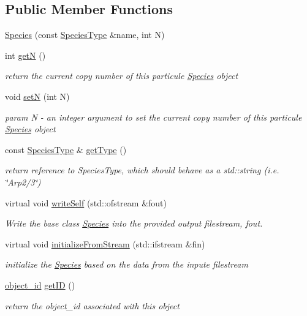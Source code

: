 \subsection*{Public Member Functions}
\begin{DoxyCompactItemize}
\item 
\hyperlink{classSpecies_ac50a5bb29d417423ea43b6698e357436}{Species} (const \hyperlink{Species_8h_af8f3afcc030f67a124aa4a6b5badf495}{Species\-Type} \&name, int N)
\item 
int \hyperlink{classSpecies_a166f138f95713c4fd02dfb47a81b515b}{get\-N} ()
\begin{DoxyCompactList}\small\item\em return the current copy number of this particule \hyperlink{classSpecies}{Species} object \end{DoxyCompactList}\item 
void \hyperlink{classSpecies_af40a72d3e3f8d3cc7bf1dfe209bed39b}{set\-N} (int N)
\begin{DoxyCompactList}\small\item\em param N -\/ an integer argument to set the current copy number of this particule \hyperlink{classSpecies}{Species} object \end{DoxyCompactList}\item 
const \hyperlink{Species_8h_af8f3afcc030f67a124aa4a6b5badf495}{Species\-Type} \& \hyperlink{classSpecies_a7b99d16574deaba7a1f4b60d93f33304}{get\-Type} ()
\begin{DoxyCompactList}\small\item\em return reference to Species\-Type, which should behave as a std\-::string (i.\-e. \char`\"{}\-Arp2/3\char`\"{}) \end{DoxyCompactList}\item 
virtual void \hyperlink{classSpecies_a8a2ec8930dd89c427245f0013aea9c69}{write\-Self} (std\-::ofstream \&fout)
\begin{DoxyCompactList}\small\item\em Write the base class \hyperlink{classSpecies}{Species} into the provided output filestream, fout. \end{DoxyCompactList}\item 
virtual void \hyperlink{classSpecies_a73ca4b8decc02298a91aff1912f57df4}{initialize\-From\-Stream} (std\-::ifstream \&fin)
\begin{DoxyCompactList}\small\item\em initialize the \hyperlink{classSpecies}{Species} based on the data from the inpute filestream \end{DoxyCompactList}\item 
\hyperlink{Object_8h_a0b56ddf6ace42572542aae1f2c364e05}{object\-\_\-id} \hyperlink{classObject_a4dd34b912b01d62f8e5aa9bcb4e82e81}{get\-I\-D} ()
\begin{DoxyCompactList}\small\item\em return the object\-\_\-id associated with this object \end{DoxyCompactList}\end{DoxyCompactItemize}
